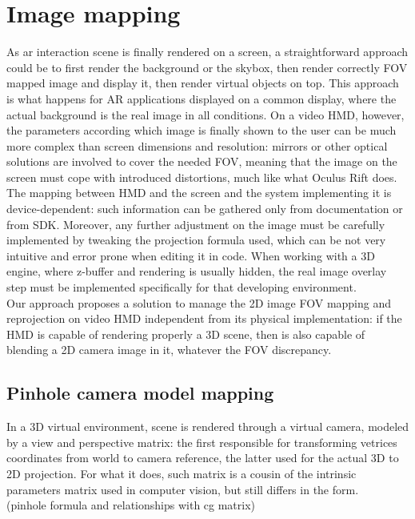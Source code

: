 \section{Image mapping}
As ar interaction scene is finally rendered on a screen, a straightforward approach could be to first render the background or the skybox, then render correctly FOV mapped image and display it, then render virtual objects on top. This approach is what happens for AR applications displayed on a common display, where the actual background is the real image in all conditions. On a video HMD, however, the parameters according which image is finally shown to the user can be much more complex than screen dimensions and resolution: mirrors or other optical solutions are involved to cover the needed FOV, meaning that the image on the screen must cope with introduced distortions, much like what Oculus Rift does. The mapping between HMD and the screen and the system implementing it is device-dependent: such information can be gathered only from documentation or from SDK. Moreover, any further adjustment on the image must be carefully implemented by tweaking the projection formula used, which can be not very intuitive and error prone when editing it in code. When working with a 3D engine, where z-buffer and rendering is usually hidden, the real image overlay step must be implemented specifically for that developing environment.\\
Our approach proposes a solution to manage the 2D image FOV mapping and reprojection on video HMD independent from its physical implementation: if the HMD is capable of rendering properly a 3D scene, then is also capable of blending a 2D camera image in it, whatever the FOV discrepancy.

\subsection{Pinhole camera model mapping}
In a 3D virtual environment, scene is rendered through a virtual camera, modeled by a view and perspective matrix: the first responsible for transforming vetrices coordinates from world to camera reference, the latter used for the actual 3D to 2D projection. For what it does, such matrix is a cousin of the intrinsic parameters matrix used in computer vision, but still differs in the form.\\

(pinhole formula and relationships with cg matrix)

